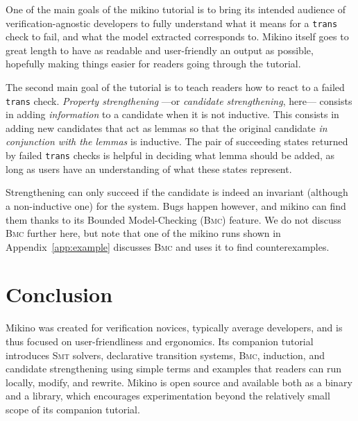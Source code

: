 \documentclass{easychair}
\newcommand{\Mkn}{Mikino}
\newcommand{\mkn}{mikino}
\newcommand{\smt}{\textsc{Smt}}
\newcommand{\bmc}{\textsc{Bmc}}
\newcommand{\presecspace}{\vspace{-.3cm}}
\newcommand{\ita}[1]{\textit{#1}}
\newcommand{\code}[1]{\textcolor{orange!75!black}{\texttt{#1}}}
\newcommand{\appref}[1]{Appendix~\ref{#1}}
\newcommand{\trans}{\code{trans}}
\begin{document}
\smallskip{}

One of the main goals of the \mkn{} tutorial is to bring its intended audience of
verification-agnostic developers to fully understand what it means for a \trans{} check to fail,
and what the model extracted corresponds to. \Mkn{} itself goes to great length to have as readable
and user-friendly an output as possible, hopefully making things easier for readers going through
the tutorial.

The second main goal of the tutorial is to teach readers how to react to a failed \trans{} check.
\ita{Property strengthening} ---or \ita{candidate strengthening}, here--- consists in adding
\ita{information} to a candidate when it is not inductive. This consists in adding new candidates
that act as lemmas so that the original candidate \ita{in conjunction with the lemmas} is
inductive. The pair of succeeding states returned by failed \trans{} checks is helpful in deciding
what lemma should be added, as long as users have an understanding of what these states represent.

Strengthening can only succeed if the candidate is indeed an invariant (although a non-inductive
one) for the system. Bugs happen however, and \mkn{} can find them thanks to its Bounded
Model-Checking (\bmc{}) feature. We do not discuss \bmc{} further here, but note that one of the
\mkn{} runs shown in \appref{app:example} discusses \bmc{} and uses it to find counterexamples.


\presecspace{}
\section{Conclusion}%
\label{sec:conclusion}

\Mkn{} was created for verification novices, typically average developers, and is thus focused on
user-friendliness and ergonomics. Its companion tutorial introduces \smt{} solvers, declarative
transition systems, \bmc{}, induction, and candidate strengthening using simple terms and examples
that readers can run locally, modify, and rewrite. \Mkn{} is open source and available both as a
binary and a library, which encourages experimentation beyond the relatively small scope of its
companion tutorial.


\newpage{}

\label{sec:bib}%

%
%
%


\newpage{}
\end{document}
